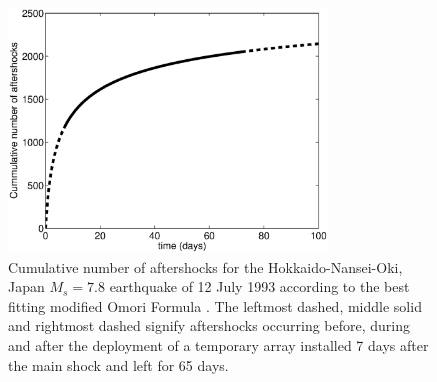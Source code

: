\documentclass[draft,jgrga]{agutex}
\begin{document}
\begin{figure}
\noindent\includegraphics[width = 20pc]{diags/OmoriFigure.eps}
\caption{Cumulative number of aftershocks for the Hokkaido-Nansei-Oki, Japan
$M_s=7.8$ earthquake of 12 July 1993 according to the best fitting modified Omori Formula
\citep{dr_Utsu95a}. The leftmost dashed, middle solid and rightmost dashed signify aftershocks occurring before, during and
after the deployment of a temporary array installed 7 days after the main shock and left for
65 days.}
\label{fig:Omorifigure}
\end{figure}
\end{document}
